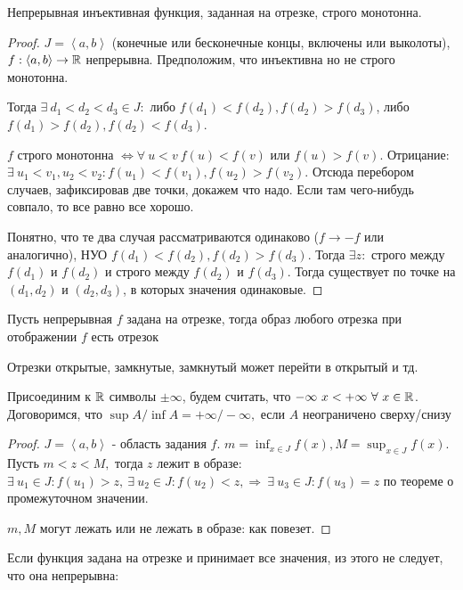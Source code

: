 \documentclass[12pt]{report}
\begin{document}
\begin{cor}
Непрерывная инъективная функция, заданная на отрезке, строго монотонна.
\end{cor}
\begin{proof}
$J = \left<a, b\right>$ (конечные или бесконечные концы, включены или выколоты), $f: \left<a, b\right> \to \mathbb{R}$ непрерывна. Предположим, что инъективна но не строго монотонна.

Тогда $\exists ~d_1 < d_2 < d_3 \in J:$ либо $f(d_1) < f(d_2), f(d_2) > f(d_3)$, либо $f(d_1) > f(d_2), f(d_2) < f(d_3)$.

$f$ строго монотонна $\Leftrightarrow \forall ~ u < v ~f(u) < f(v)$ или $f(u) > f(v)$. Отрицание: $\exists ~u_1 < v_1, u_2 < v_2: f(u_1) < f(v_1), f(u_2) > f(v_2)$. Отсюда перебором случаев, зафиксировав две точки, докажем что надо. Если там чего-нибудь совпало, то все равно все хорошо.

Понятно, что те два случая рассматриваются одинаково ($f \to -f$ или аналогично), НУО $f(d_1) < f(d_2), f(d_2) > f(d_3)$. Тогда $\exists z:$ строго между $f(d_1)$ и $f(d_2)$ и строго между $f(d_2)$ и $f(d_3)$. Тогда существует по точке на $(d_1, d_2)$ и $(d_2, d_3)$, в которых значения одинаковые.
\end{proof}

\begin{thm}
Пусть непрерывная $f$ задана на отрезке, тогда образ любого отрезка при отображении $f$ есть отрезок
\end{thm}
\begin{note}
Отрезки открытые, замкнутые, замкнутый может перейти в открытый и тд.
\end{note}
\begin{note}[Соглашение]
Присоединим к $\mathbb{R}$ символы $\pm\infty$, будем считать, что $-\infty ~x < +\infty ~\forall ~x \in \mathbb{R}$. Договоримся, что $\sup{A}/\inf{A} = +\infty / -\infty,$ если $A$ неограничено сверху/снизу
\end{note}
\begin{proof}
$J = \left<a, b\right>$ - область задания $f$. $m = \inf_{x \in J}{f(x)}, M = \sup_{x \in J}{f(x)}$. Пусть $m < z < M,$ тогда $z$ лежит в образе: $\exists ~u_1 \in J: f(u_1) > z, ~\exists ~u_2 \in J: f(u_2) < z, \Rightarrow ~\exists ~u_3 \in J: f(u_3) = z$ по теореме о промежуточном значении.

$m, M$ могут лежать или не лежать в образе: как повезет.
\end{proof}

\begin{note}
Если функция задана на отрезке и принимает все значения, из этого не следует, что она непрерывна:
\end{note}
\end{document}
